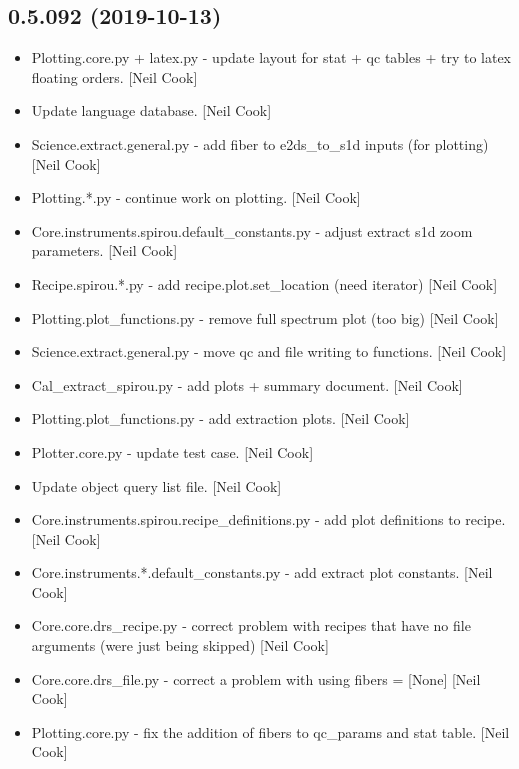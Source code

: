 \documentclass[a4paper,10pt,english]{report}
\begin{document}
\subsection{0.5.092 (2019-10-13)}
\label{\detokenize{misc/changelog:id49}}\begin{itemize}
\item {} 
Plotting.core.py + latex.py - update layout for stat + qc tables + try
to latex floating orders. {[}Neil Cook{]}

\item {} 
Update language database. {[}Neil Cook{]}

\item {} 
Science.extract.general.py - add fiber to e2ds\_to\_s1d inputs (for
plotting) {[}Neil Cook{]}

\item {} 
Plotting.*.py - continue work on plotting. {[}Neil Cook{]}

\item {} 
Core.instruments.spirou.default\_constants.py - adjust extract s1d zoom
parameters. {[}Neil Cook{]}

\item {} 
Recipe.spirou.*.py - add recipe.plot.set\_location (need iterator)
{[}Neil Cook{]}

\item {} 
Plotting.plot\_functions.py - remove full spectrum plot (too big) {[}Neil
Cook{]}

\item {} 
Science.extract.general.py - move qc and file writing to functions.
{[}Neil Cook{]}

\item {} 
Cal\_extract\_spirou.py - add plots + summary document. {[}Neil Cook{]}

\item {} 
Plotting.plot\_functions.py - add extraction plots. {[}Neil Cook{]}

\item {} 
Plotter.core.py - update test case. {[}Neil Cook{]}

\item {} 
Update object query list file. {[}Neil Cook{]}

\item {} 
Core.instruments.spirou.recipe\_definitions.py - add plot definitions
to recipe. {[}Neil Cook{]}

\item {} 
Core.instruments.*.default\_constants.py - add extract plot constants.
{[}Neil Cook{]}

\item {} 
Core.core.drs\_recipe.py - correct problem with recipes that have no
file arguments (were just being skipped) {[}Neil Cook{]}

\item {} 
Core.core.drs\_file.py - correct a problem with using fibers = {[}None{]}
{[}Neil Cook{]}

\item {} 
Plotting.core.py - fix the addition of fibers to qc\_params and stat
table. {[}Neil Cook{]}

\end{itemize}
\end{document}
